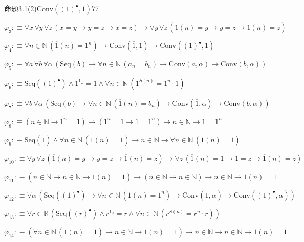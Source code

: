 \begin{fullproof}{命題3.1(2)}{$\mathrm{Conv}({(1)^{\bullet}},1)$}{77}
\begin{abbrevlist}
\item $\varphi_{3} :\equiv \forall x\,\forall y\,\forall z\,(x = y \to y = z \to x = z) \to \forall y\,\forall z\,(\overline{1}(n) = y \to y = z \to \overline{1}(n) = z)$
\item $\varphi_{4} :\equiv \forall n \in \mathbb{N}\,(\overline{1}(n) = {{1}^{n}}) \to \mathrm{Conv}(\overline{1},1) \to \mathrm{Conv}({(1)^{\bullet}},1)$
\item $\varphi_{5} :\equiv \forall a\,\forall b\,\forall \alpha\,(\mathrm{Seq}(b) \to \forall n \in \mathbb{N}\,(a_{n} = b_{n}) \to \mathrm{Conv}(a,\alpha) \to \mathrm{Conv}(b,\alpha))$
\item $\varphi_{6} :\equiv \mathrm{Seq}({(1)^{\bullet}}) \land {{1}^{1_{\omega}}} = 1 \land \forall n \in \mathbb{N}\,({{1}^{S(n)}} = {{1}^{n}} \cdot 1)$
\item $\varphi_{7} :\equiv \forall b\,\forall \alpha\,(\mathrm{Seq}(b) \to \forall n \in \mathbb{N}\,(\overline{1}(n) = b_{n}) \to \mathrm{Conv}(\overline{1},\alpha) \to \mathrm{Conv}(b,\alpha))$
\item $\varphi_{8} :\equiv (n \in \mathbb{N} \to {{1}^{n}} = 1) \to ({{1}^{n}} = 1 \to 1 = {{1}^{n}}) \to n \in \mathbb{N} \to 1 = {{1}^{n}}$
\item $\varphi_{9} :\equiv \mathrm{Seq}(\overline{1}) \land \forall n \in \mathbb{N}\,(\overline{1}(n) = 1) \to n \in \mathbb{N} \to \forall n \in \mathbb{N}\,(\overline{1}(n) = 1)$
\item $\varphi_{10} :\equiv \forall y\,\forall z\,(\overline{1}(n) = y \to y = z \to \overline{1}(n) = z) \to \forall z\,(\overline{1}(n) = 1 \to 1 = z \to \overline{1}(n) = z)$
\item $\varphi_{11} :\equiv (n \in \mathbb{N} \to n \in \mathbb{N} \to \overline{1}(n) = 1) \to (n \in \mathbb{N} \to n \in \mathbb{N}) \to n \in \mathbb{N} \to \overline{1}(n) = 1$
\item $\varphi_{12} :\equiv \forall \alpha\,(\mathrm{Seq}({(1)^{\bullet}}) \to \forall n \in \mathbb{N}\,(\overline{1}(n) = {{1}^{n}}) \to \mathrm{Conv}(\overline{1},\alpha) \to \mathrm{Conv}({(1)^{\bullet}},\alpha))$
\item $\varphi_{13} :\equiv \forall r \in \mathbb{R}\,(\mathrm{Seq}({(r)^{\bullet}}) \land {{r}^{1_{\omega}}} = r \land \forall n \in \mathbb{N}\,({{r}^{S(n)}} = {{r}^{n}} \cdot r))$
\item $\varphi_{14} :\equiv (\forall n \in \mathbb{N}\,(\overline{1}(n) = 1) \to n \in \mathbb{N} \to \overline{1}(n) = 1) \to n \in \mathbb{N} \to n \in \mathbb{N} \to \overline{1}(n) = 1$

\end{abbrevlist}
\end{fullproof}
